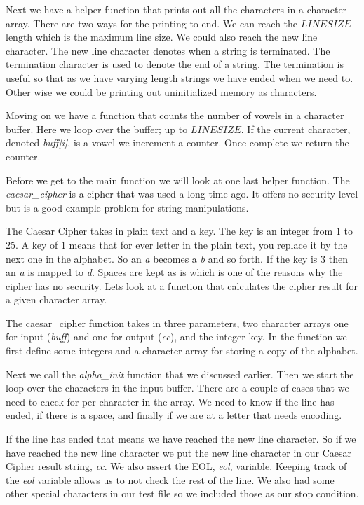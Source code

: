Next we have a helper function that prints out all the characters in a character array. There are two ways for the printing to end. We can reach the $LINESIZE$ length which is the maximum line size. We could also reach the new line character. The new line character denotes when a string is terminated. The termination character is used to denote the end of a string. The termination is useful so that as we have varying length strings we have ended when we need to. Other wise we could be printing out uninitialized memory as  characters. 

Moving on we have a function that counts the number of vowels in a character buffer. Here we loop over the buffer; up to $LINESIZE$. If the current character, denoted \emph{buff[i]}, is a vowel we increment a counter. Once complete we return the counter. 

Before we get to the main function we will look at one last helper function. The \emph{caesar\_cipher} is a cipher that was used a long time ago. It offers no security level but is a good example problem for string manipulations. 

The Caesar Cipher takes in plain text and a key. The key is an integer from $1$ to $25$. A key of $1$ means that for ever letter in the plain text, you replace it by the next one in the alphabet. So an \emph{a} becomes a \emph{b} and so forth. If the key is $3$ then an \emph{a} is mapped to \emph{d}. Spaces are kept as is which is one of the reasons why the cipher has no security. Lets look at a function that calculates the cipher result for a given character array. 

The caesar\_cipher function takes in three parameters, two character arrays one for input (\emph{buff}) and one for output (\emph{cc}), and the integer key. In the function we first define some integers and a character array for storing a copy of the alphabet. 

Next we call the \emph{alpha\_init} function that we discussed earlier. Then we start the loop over the characters in the input buffer. There are a couple of cases that we need to check for per character in the array. We need to know if the line has ended, if there is a space, and finally if we are at a letter that needs encoding. 

If the line has ended that means we have reached the new line character. So if we have reached the new line character we put the new line character in our Caesar Cipher result string, \emph{cc}. We also assert the \ac{EOL}, \emph{eol}, variable. Keeping track of the \emph{eol} variable allows us to not check the rest of the line. We also had some other special characters in our test file so we included those as our stop condition. 

